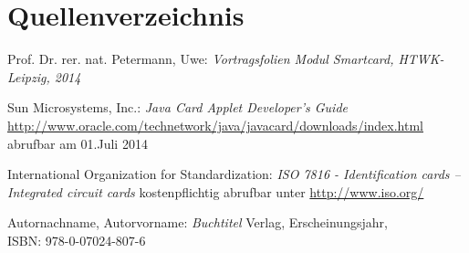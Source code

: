 \documentclass[a4paper,12pt]{scrartcl}
\begin{document}
\clearpage
\section{Quellenverzeichnis}
\label{sec:6}
\renewcommand\refname{Quellenverzeichnis}
\begin{thebibliography}{999}

Prof. Dr. rer. nat. Petermann, Uwe: {\sl   Vortragsfolien Modul Smartcard, HTWK-Leipzig, 2014}

Sun Microsystems, Inc.:  {\sl Java Card Applet Developer's Guide}\\
\url{http://www.oracle.com/technetwork/java/javacard/downloads/index.html}\\
abrufbar am 01.Juli 2014

International Organization for Standardization: {\sl ISO 7816 - Identification cards -- Integrated circuit cards}
kostenpflichtig abrufbar unter \url{http://www.iso.org/}

Autornachname, Autorvorname:  {\sl Buchtitel} Verlag, Erscheinungsjahr,
\\ISBN:  978-0-07024-807-6




\end{thebibliography}
\end{document}
